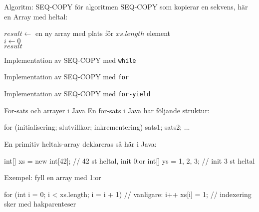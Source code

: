\begin{Slide}{Algoritm: SEQ-COPY}
 för algoritmen SEQ-COPY som kopierar en sekvens, här en Array med heltal:\\
\noindent\hrulefill
\begin{algorithm}[H]
 $result \leftarrow$ en ny array med plats för $xs.length$ element\\
 $i \leftarrow 0$  \\
 \Return $result$
\end{algorithm}
\noindent\hrulefill
\end{Slide}

\ifkompendium\else

\begin{Slide}{Implementation av SEQ-COPY med \texttt{while}}

\end{Slide}

\begin{Slide}{Implementation av SEQ-COPY med \texttt{for}}

\end{Slide}

\begin{Slide}{Implementation av SEQ-COPY med \texttt{for-yield}}

\end{Slide}

\begin{Slide}{For-sats och arrayer i Java}
En for-sats i Java har följande struktur:
\begin{Code}[language=Java, basicstyle=\fontsize{10}{12}\ttfamily\selectfont]
for (initialisering; slutvillkor; inkrementering) {
    sats1;
    sats2;
    ...
}
\end{Code}
En primitiv heltals-array deklareras så här i Java:
\begin{Code}[language=Java, basicstyle=\fontsize{10}{12}\ttfamily\selectfont]
int[] xs = new int[42];  // 42 st heltal, init 0:or
int[] ys = {1, 2, 3};    // init 3 st heltal  
\end{Code}
Exempel: fyll en array med 1:or 
\begin{Code}[language=Java, basicstyle=\fontsize{9}{11}\ttfamily\selectfont]
for (int i = 0; i < xs.length; i = i + 1){ // vanligare: i++
  xs[i] = 1;    // indexering sker med hakparenteser
}
\end{Code}

\end{Slide}

